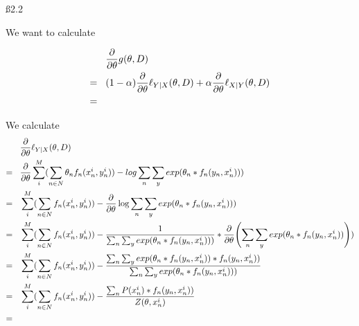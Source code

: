 \ss{2.2}

We want to calculate 

\def\t{\pdv{\theta}}

\begin{align*}
& \pdv{\theta} g(\theta,D) \nl
(1-\alpha)\t\ell_{Y \mid X}(\theta, D) + \alpha\t\ell_{X \mid Y}(\theta,D)\nl
\end{align*}

We calculate 
\begin{align*}
& \t\ell_{Y \mid X}(\theta, D) \nl
\t \sum_i^M (\sum_{n \in N} \theta_n f_n(x_n^i,y_n^i)) - log \sum_n \sum_y exp(\theta_n * f_n(y_n,x_n^i))) \nl
\sum_i^M (\sum_{n \in N} f_n(x_n^i,y_n^i)) - \t\log \sum_n \sum_y exp(\theta_n * f_n(y_n,x_n^i))) \nl
\sum_i^M (\sum_{n \in N} f_n(x_n^i,y_n^i)) - \frac{1}{\sum_n \sum_y exp(\theta_n * f_n(y_n,x_n^i)))} * \t (\sum_n \sum_y exp(\theta_n * f_n(y_n,x_n^i)))) \nl
\sum_i^M (\sum_{n \in N} f_n(x_n^i,y_n^i)) - \frac{\sum_n \sum_y exp(\theta_n * f_n(y_n,x_n^i)) * f_n(y_n,x_n^i))}{\sum_n \sum_y exp(\theta_n * f_n(y_n,x_n^i)))} \nl
\sum_i^M (\sum_{n \in N} f_n(x_n^i,y_n^i)) - \frac{\sum_n P(x_n^i) * f_n(y_n,x_n^i))}{Z(\theta, x_n^i)} \nl
\end{align*}

